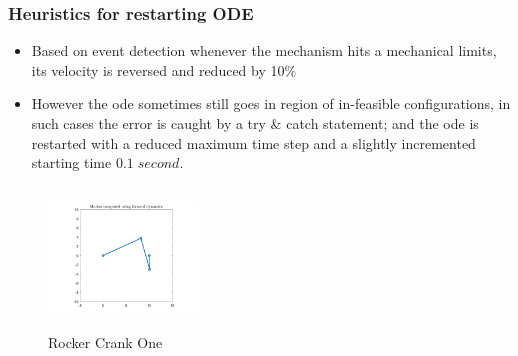 \documentclass[10pt,aspectratio=169]{beamer}
\begin{document}
\begin{frame}
\frametitle{Heuristics for restarting ODE}
\begin{itemize}
	\item Based on event detection whenever the mechanism hits a mechanical limits, its velocity is reversed and reduced by 10\%
	\item However the ode sometimes still goes in region of in-feasible configurations, in such cases the error is caught by a try \& catch statement; and the ode is restarted with a reduced maximum time step and a slightly incremented starting time $0.1\; second$.
\end{itemize}

\begin{columns}
	\begin{column}{4cm}
	\begin{figure}
		\centering
		\href{run:./figure/rockerCrank1Forward.avi}{\includegraphics[width=4cm,keepaspectratio]{rockerCrank1banner}}
		\caption{\scriptsize{Rocker Crank One}}
	\end{figure}


\end{column}
\end{columns}
\end{frame}
\end{document}
